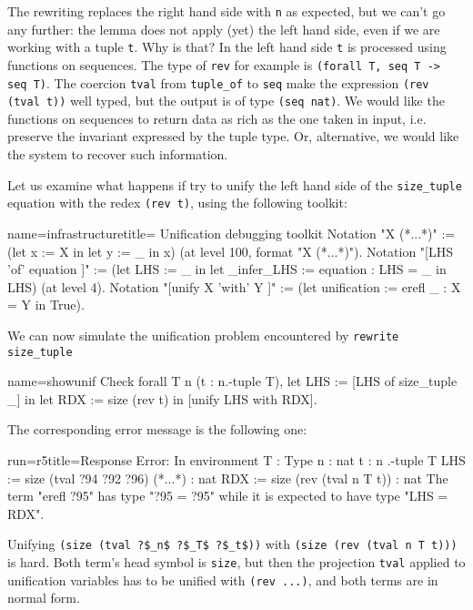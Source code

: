 The rewriting replaces the right hand side with \lstinline/n/ as
expected, but we can't go any further: the lemma does not
apply (yet) the left hand side, even if we are working
with a tuple \lstinline/t/.  Why is that?  In the left hand side
\lstinline/t/ is processed using functions on sequences.
The type of \lstinline/rev/ for example is
\lstinline/(forall T, seq T -> seq T)/.  The coercion \lstinline/tval/
from \lstinline/tuple_of/ to \lstinline/seq/ make the
expression \lstinline/(rev (tval t))/ well typed, but the output
is of type \lstinline/(seq nat)/.  
We would like the functions on sequences to return
data as rich as the one taken in input, i.e. preserve the invariant
expressed by the tuple type.  Or, alternative, we would like the
system to recover such information.

Let us examine what happens if try to unify the left hand side of the
\lstinline/size_tuple/ equation with the redex
\lstinline/(rev t)/, using the following toolkit:

\begin{coq}{name=infrastructure}{title= Unification debugging toolkit}
Notation "X (*...*)" :=
  (let x := X in let y := _ in x)   (at level 100, format "X  (*...*)").
Notation "[LHS 'of' equation ]" :=
  (let LHS := _ in
   let _infer_LHS := equation : LHS = _ in LHS)   (at level 4).
Notation "[unify X 'with' Y ]" :=
  (let unification := erefl _ : X = Y in True).
\end{coq}

We can now simulate the unification problem
encountered by \lstinline/rewrite size_tuple/

\begin{coq}{name=showunif}{}
Check forall T n (t : n.-tuple T),
 let LHS := [LHS of size_tuple _] in
 let RDX := size (rev t) in
 [unify LHS with RDX].
\end{coq}

The corresponding error message is the following one:

\begin{coqout}{run=r5}{title=Response}
Error:
In environment
T : Type
n : nat
t : n .-tuple T
LHS := size (tval ?94 ?92 ?96) (*...*) : nat
RDX := size (rev (tval n T t))           : nat
The term "erefl ?95" has type "?95 = ?95" while
it is expected to have type "LHS = RDX".
\end{coqout}

Unifying \lstinline/(size (tval ?$_n$ ?$_T$ ?$_t$))/
with \lstinline/(size (rev (tval n T t)))/ is hard.
Both term's head symbol is \lstinline/size/, but then
the projection \lstinline/tval/ applied to unification
variables has to be unified with \lstinline/(rev ...)/,
and both terms are in normal form.

